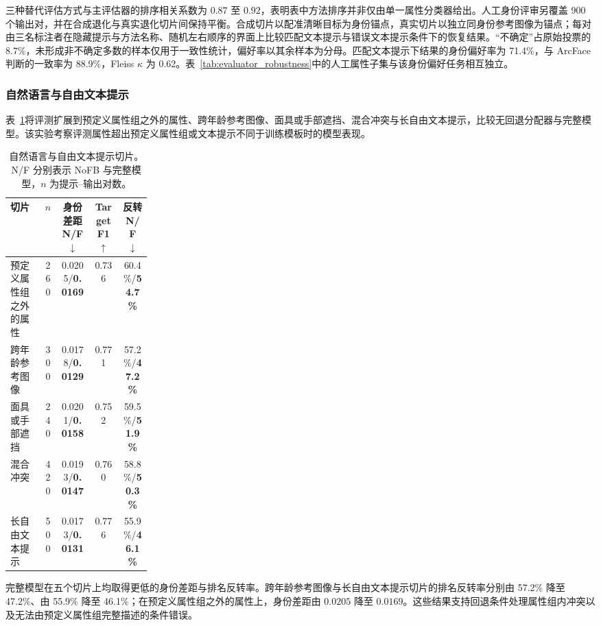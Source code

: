 \documentclass[journal]{IEEEtran}
\begin{document}
三种替代评估方式与主评估器的排序相关系数为 $0.87$ 至 $0.92$，表明表中方法排序并非仅由单一属性分类器给出。人工身份评审另覆盖 900 个输出对，并在合成退化与真实退化切片间保持平衡。合成切片以配准清晰目标为身份锚点，真实切片以独立同身份参考图像为锚点；每对由三名标注者在隐藏提示与方法名称、随机左右顺序的界面上比较匹配文本提示与错误文本提示条件下的恢复结果。“不确定”占原始投票的 8.7\%，未形成非不确定多数的样本仅用于一致性统计，偏好率以其余样本为分母。匹配文本提示下结果的身份偏好率为 71.4\%，与 ArcFace 判断的一致率为 88.9\%，Fleiss $\kappa$ 为 0.62。表~\ref{tab:evaluator_robustness}中的人工属性子集与该身份偏好任务相互独立。

\subsubsection{自然语言与自由文本提示}
表~\ref{tab:natural_breakdown}将评测扩展到预定义属性组之外的属性、跨年龄参考图像、面具或手部遮挡、混合冲突与长自由文本提示，比较无回退分配器与完整模型。该实验考察评测属性超出预定义属性组或文本提示不同于训练模板时的模型表现。

\begin{table}[!t]
\centering
\caption{自然语言与自由文本提示切片。N/F 分别表示 NoFB 与完整模型，$n$ 为提示--输出对数。}
\label{tab:natural_breakdown}
{\scriptsize
\setlength{\tabcolsep}{1pt}
\begin{tabular}{p{0.24\linewidth}cccc}
\toprule
切片 & $n$ & 身份差距 N/F $\downarrow$ & Target F1 $\uparrow$ & 反转 N/F $\downarrow$ \\
\midrule
预定义属性组之外的属性 & 260 & 0.0205/\textbf{0.0169} & 0.736 & 60.4\%/\textbf{54.7\%} \\
跨年龄参考图像 & 300 & 0.0178/\textbf{0.0129} & 0.771 & 57.2\%/\textbf{47.2\%} \\
面具或手部遮挡 & 240 & 0.0201/\textbf{0.0158} & 0.752 & 59.5\%/\textbf{51.9\%} \\
混合冲突 & 420 & 0.0193/\textbf{0.0147} & 0.760 & 58.8\%/\textbf{50.3\%} \\
长自由文本提示 & 500 & 0.0173/\textbf{0.0131} & 0.776 & 55.9\%/\textbf{46.1\%} \\
\bottomrule
\end{tabular}
}
\end{table}

完整模型在五个切片上均取得更低的身份差距与排名反转率。跨年龄参考图像与长自由文本提示切片的排名反转率分别由 57.2\% 降至 47.2\%、由 55.9\% 降至 46.1\%；在预定义属性组之外的属性上，身份差距由 $0.0205$ 降至 $0.0169$。这些结果支持回退条件处理属性组内冲突以及无法由预定义属性组完整描述的条件错误。
\end{document}
